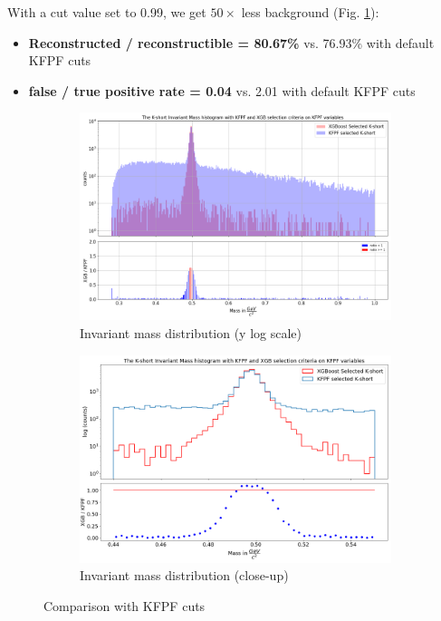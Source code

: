 With a cut value set to 0.99, we get $50\times$ less background (Fig. \ref{bckgr}):
\begin{itemize}
    \item \textbf{Reconstructed \PKshort / reconstructible \PKshort = 80.67\%}  vs. 76.93\% with default KFPF cuts
    \item \textbf{false / true positive rate = 0.04} vs. 2.01 with default KFPF cuts
\end{itemize}
\begin{figure}
 \centering
    \begin{subfigure}[b]{0.99\linewidth} 
        \centering
        \includegraphics[width=\textwidth]{img/better_reduction1.png} 
        \caption{Invariant mass distribution (y log scale)} 
        \vspace{0.3cm}
    \end{subfigure}
     \hfill
       \begin{subfigure}[b]{0.99\linewidth}
        \centering
        \includegraphics[width=\textwidth]{img/better_reduction2.png} 
        \caption{Invariant mass distribution (close-up)}
        \vspace{0.3cm}
    \end{subfigure}
    \caption{Comparison with KFPF cuts}\label{bckgr}
\end{figure}

